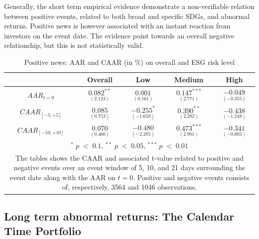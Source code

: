 Generally, the short term empirical evidence demonstrate a non-verifiable relation between positive events, related to both broad and specific SDGs, and abnormal returns. Positive news is however associated with an instant reaction from investors on the event date. The evidence point towards an overall negative relationship, but this is not statistically valid.  




\begin{table}[H]
\centering
\caption{Positive news: AAR and CAAR (in \%) on overall and ESG risk level} 
\begin{tabular}{ccccc}
  \hline  \hline
  & \multicolumn{1}{c}{Overall} &  \multicolumn{1}{c}{Low} & \multicolumn{1}{c}{Medium} & \multicolumn{1}{c}{High}\\  
 \hline
$AAR_{t=0}$ &  $\underset{(2.123)}{0.082^{**}}$ & $\underset{(0.161)}{0.001}$ & $\underset{(2.771)}{0.147^{***}}$ &  $\underset{(-0.355)}{-0.049}$ \\ 
$CAAR_{[-5;+5]}$  & $\underset{(0.753)}{0.085}$ &  $\underset{(-1.658)}{-0.255^{*}}$ &  $\underset{(2.282)}{0.390^{**}}$ &  $\underset{(-1.248)}{-0.438}$ \\ 
$CAAR_{[-10;+10]}$    & $\underset{(0.460)}{0.070}$ &  $\underset{(-2.285)}{-0.480}$ &  $\underset{(2.901)}{0.473^{***}}$ &  $\underset{(-0.803)}{-0.341}$ \\ 
    \hline \hline
   \multicolumn{5}{p{10cm}}{ \footnotesize $^* \; p\; <\; 0.1$, $ ^{**} \; p\; <\; 0.05$, $ ^{***} \; p\; <\; 0.01$  } \\
   \multicolumn{5}{p{10cm}}{\footnotesize The tables shows the CAAR and associated t-value related to positive and negative events over an event window of 5, 10, and 21 days surrounding the event date along with the AAR on $t=0$. Positive and negative events consists of, respectively, 3564 and 1046 observations. } \\
   \hline
\end{tabular}
\label{tab: ST_pos_significance}
\end{table}




\subsection{Long term abnormal returns: The Calendar Time Portfolio} \label{sec: long_term_portfolio}

